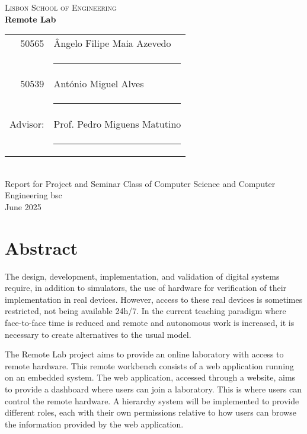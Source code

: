 \documentclass[a4paper,openright,twoside,11pt]{report}
\begin{document}
\cleardoublepage
\begin{center}
\textsc{\LARGE Lisbon School of Engineering}\\[15mm]

{\Large \bf  Remote Lab}\\[20mm]

\begin{tabular}{rl}
  50565  & Ângelo Filipe Maia Azevedo\\[10mm]
           & \rule{75mm}{0.5pt}\\[5mm]

  50539  & António Miguel Alves\\[10mm]
           & \rule{75mm}{0.5pt}\\[5mm]

  Advisor: & Prof. Pedro Miguens Matutino\\[10mm]
      & \rule{75mm}{0.5pt}\\[5mm]
\end{tabular}\\[5cm]
{\large Report for Project and Seminar Class of Computer Science and Computer Engineering \acs{bsc}\\[3cm]}
June 2025\\
\end{center}

\cleardoublepage
\chapter*{Abstract}
The design, development, implementation, and validation of digital systems require, in addition 
to simulators, the use of hardware for verification of their implementation in real devices. 
However, access to these real devices is sometimes restricted, not being available 24h/7. 
In the current teaching paradigm where face-to-face time is reduced and remote and autonomous work 
is increased, it is necessary to create alternatives to the usual model.

The Remote Lab project aims to provide an online laboratory with access to remote hardware.
This remote workbench consists of a web application running on an embedded system. The web application, accessed through a website, 
aims to provide a dashboard where users can join a laboratory. This
is where users can control the remote hardware. A hierarchy system will be implemented to
provide different roles, each with their own permissions relative to how users can browse the
information provided by the web application.
\end{document}
